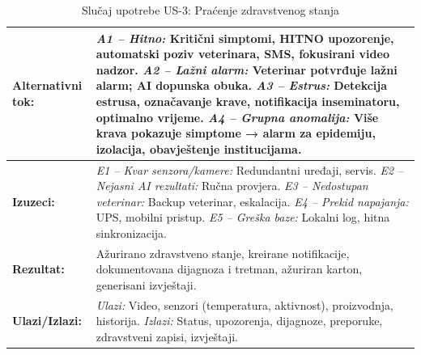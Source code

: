 \documentclass{article}
\begin{document}
\begin{table}[H]
\begin{tabular}{|p{3.5cm}|p{11cm}|}
\hline
\textbf{Alternativni tok:} & 
\textit{A1 – Hitno:} Kritični simptomi, HITNO upozorenje, automatski poziv veterinara, SMS, fokusirani video nadzor. \newline
\textit{A2 – Lažni alarm:} Veterinar potvrđuje lažni alarm; AI dopunska obuka. \newline
\textit{A3 – Estrus:} Detekcija estrusa, označavanje krave, notifikacija inseminatoru, optimalno vrijeme. \newline
\textit{A4 – Grupna anomalija:} Više krava pokazuje simptome → alarm za epidemiju, izolacija, obavještenje institucijama. \\
\hline
\textbf{Izuzeci:} & 
\textit{E1 – Kvar senzora/kamere:} Redundantni uređaji, servis. \newline
\textit{E2 – Nejasni AI rezultati:} Ručna provjera. \newline
\textit{E3 – Nedostupan veterinar:} Backup veterinar, eskalacija. \newline
\textit{E4 – Prekid napajanja:} UPS, mobilni pristup. \newline
\textit{E5 – Greška baze:} Lokalni log, hitna sinkronizacija. \\
\hline
\textbf{Rezultat:} & Ažurirano zdravstveno stanje, kreirane notifikacije, dokumentovana dijagnoza i tretman, ažuriran karton, generisani izvještaji. \\
\hline
\textbf{Ulazi/Izlazi:} & 
\textit{Ulazi:} Video, senzori (temperatura, aktivnost), proizvodnja, historija. \newline
\textit{Izlazi:} Status, upozorenja, dijagnoze, preporuke, zdravstveni zapisi, izvještaji. \\
\hline
\end{tabular}
\caption{Slučaj upotrebe US-3: Praćenje zdravstvenog stanja}
\end{table}


\pagebreak
\end{document}
